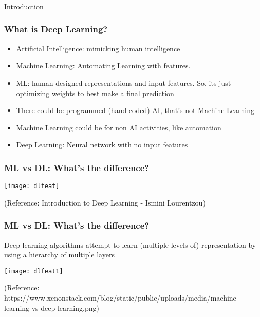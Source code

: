 \begin{frame}[fragile]\frametitle{}
\begin{center}
{\Large Introduction}
\end{center}
\end{frame}


\begin{frame}[fragile] \frametitle{What is Deep Learning?}

\begin{itemize}
\item Artificial Intelligence: mimicking human intelligence
\item Machine Learning: Automating Learning with features. 
\item ML: human-designed representations and input features.  So, its just optimizing weights to best make a final prediction
\item There could be programmed (hand coded) AI, that's not Machine Learning
\item Machine Learning could be for non AI activities, like automation
\item Deep Learning: Neural network with no input features
\end{itemize}
\end{frame}


\begin{frame}[fragile] \frametitle{ML vs DL: What's the difference?}
\begin{center}
\texttt{[image: dlfeat]}
\end{center}
\tiny{(Reference: Introduction to Deep Learning - Ismini Lourentzou)}
\end{frame}



\begin{frame}[fragile] \frametitle{ML vs DL: What's the difference?}
Deep learning algorithms attempt to learn (multiple levels of) representation by using a hierarchy of multiple layers
\begin{center}
\texttt{[image: dlfeat1]}
\end{center}
\tiny{(Reference: https://www.xenonstack.com/blog/static/public/uploads/media/machine-learning-vs-deep-learning.png)}

\end{frame}

